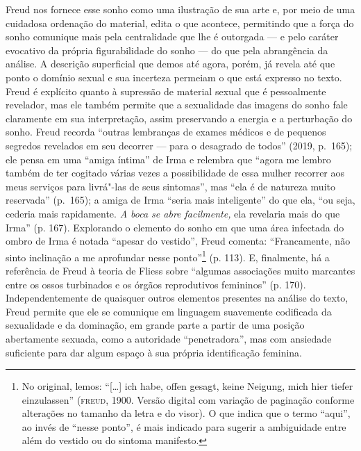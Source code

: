Freud nos fornece esse sonho como uma ilustração de sua arte e, por meio
de uma cuidadosa ordenação do material, edita o que acontece, permitindo
que a força do sonho comunique mais pela centralidade que lhe é
outorgada --- e pelo caráter evocativo da própria figurabilidade do sonho
--- do que pela abrangência da análise. A descrição superficial que demos
até agora, porém, já revela até que ponto o domínio sexual e sua
incerteza permeiam o que está expresso no texto. Freud é explícito
quanto à supressão de material sexual que é pessoalmente revelador, mas
ele também permite que a sexualidade das imagens do sonho fale
claramente em sua interpretação, assim preservando a energia e a
perturbação do sonho. Freud recorda ``outras lembranças de exames
médicos e de pequenos segredos revelados em seu decorrer --- para o
desagrado de todos'' (2019, p.~165); ele pensa em uma
``amiga íntima'' de Irma e relembra que ``agora me lembro também de ter
cogitado várias vezes a possibilidade de essa mulher recorrer aos meus
serviços para livrá"-las de seus sintomas'', mas ``ela é de natureza
muito reservada'' (p.~165); a amiga de Irma ``seria mais inteligente'' do
que ela, ``ou seja, cederia mais rapidamente. \emph{A boca se abre
facilmente,} ela revelaria mais do que Irma'' (p. 167). Explorando o
elemento do sonho em que uma área infectada do ombro de Irma é notada
``apesar do vestido'', Freud comenta: ``Francamente, não sinto
inclinação a me aprofundar nesse ponto''\footnote{No original, lemos:
  ``{[}\ldots{}{]} ich habe, offen gesagt, keine Neigung, mich hier
  tiefer einzulassen'' (\textsc{freud}, 1900. Versão digital com variação de
  paginação conforme alterações no tamanho da letra e do visor). O que
  indica que o termo ``aqui'', ao invés de ``nesse ponto'', é mais
  indicado para sugerir a ambiguidade entre além do vestido ou do
  sintoma manifesto.} (p. 113). E, finalmente, há a referência de Freud
à teoria de Fliess sobre ``algumas associações muito marcantes entre os
ossos turbinados e os órgãos reprodutivos femininos'' (p. 170).
Independentemente de quaisquer outros elementos presentes na análise do
texto, Freud permite que ele se comunique em linguagem suavemente
codificada da sexualidade e da dominação, em grande parte a partir de
uma posição abertamente sexuada, como a autoridade ``penetradora'', mas
com ansiedade suficiente para dar algum espaço à sua própria
identificação feminina.

